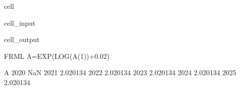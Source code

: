 \documentclass[letterpaper,10pt,english]{jupyterBook}
\begin{document}
\begin{sphinxuseclass}{cell}\begin{sphinxVerbatimInput}

\begin{sphinxuseclass}{cell_input}
\begin{sphinxVerbatim}[commandchars=\\\{\}]
  
\end{sphinxVerbatim}

\end{sphinxuseclass}\end{sphinxVerbatimInput}
\begin{sphinxVerbatimOutput}

\begin{sphinxuseclass}{cell_output}
\begin{sphinxVerbatim}[commandchars=\\\{\}]
FRML \PYGZlt{}\PYGZgt{} A=EXP(LOG(A(\PYGZhy{}1))+0.02)\PYGZdl{}
\end{sphinxVerbatim}

\begin{sphinxVerbatim}[commandchars=\\\{\}]
             A
2020       NaN
2021  2.020134
2022  2.020134
2023  2.020134
2024  2.020134
2025  2.020134
\end{sphinxVerbatim}

\end{sphinxuseclass}\end{sphinxVerbatimOutput}

\end{sphinxuseclass}
\end{document}
